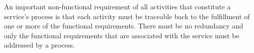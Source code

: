 An important non-functional requirement of all activities that constitute a service's process is that each activity must be traceable back to the fulfillment of one or more of the functional requirements. There must be no redundancy and only the functional requirements that are associated with the service must be addressed by a process.